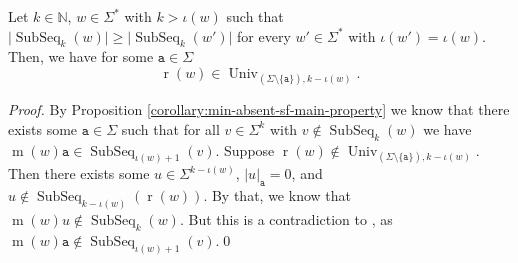 \documentclass[runningheads,UKenglish,cleveref, autoref, thm-restate]{llncs}
\newcommand{\N}{\mathbb{N}}
\def\ta{\mathtt{a}}
\def\tb{\mathtt{b}}
\def\r{\operatorname{r}}
\def\m{\operatorname{m}}
\DeclareMathOperator{\arch}{ar}
\DeclareMathOperator{\alphabet}{alph}
\DeclareMathOperator\ScatFact{SubSeq}
\DeclareMathOperator{\Univ}{Univ}
\DeclareMathOperator{\inner}{in}
\newcommand{\todofpa}[1]{\todo[color=cyan!20,inline]{#1}}
\newcommand{\todoah}[1]{\todo[color=violet,inline, textcolor = white]{#1}}
\newif\ifpaper
\begin{document}
\fi







\ifpaper
\else
\begin{lemma}\label{remark:min-absent-rest-k-iota-universal}
    Let $k\in\N$, $w\in\Sigma^{\ast}$ with $k>\iota(w)$ such that $\vert \ScatFact_k(w) \vert \geq \vert \ScatFact_k(w') \vert$ for every $w' \in \Sigma^*$ with $\iota(w') = \iota(w)$. 
    Then, we have for some $\ta\in\Sigma$ 
    \[
    \r(w) \in \Univ_{(\Sigma \setminus \{ \ta \}), k - \iota(w)}.
    \]
\end{lemma}

\begin{proof}
	By Proposition \ref{corollary:min-absent-sf-main-property} we know that there exists some $\ta\in\Sigma$ such that
	for all $v\in\Sigma^k$ with $v\notin\ScatFact_k(w)$ we have $\m(w)\ta\in\ScatFact_{\iota(w)+1}(v)$.
	Suppose $\r(w) \notin \Univ_{(\Sigma \setminus \{ \ta \}), k - \iota(w)}$.
	Then there exists some $u\in\Sigma^{k-\iota(w)}$, $|u|_\ta = 0$, and $u\notin\ScatFact_{k-\iota(w)}(\r(w))$.
	By that, we know that $\m(w)u\notin\ScatFact_k(w)$. But this is a contradiction to , as $\m(w)\ta\notin\ScatFact_{\iota(w)+1}(v)$.\qed
\end{proof}
\fi
\end{document}
